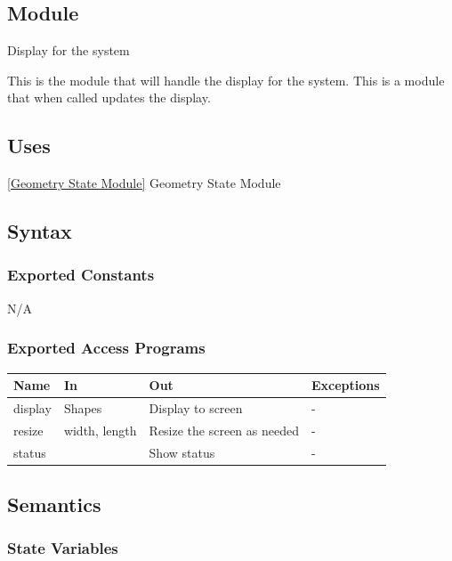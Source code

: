 \documentclass[12pt, titlepage]{article}
\begin{document}

\subsection{Module}

Display for the system

This is the module that will handle the display for the system.
 This is a module that when called updates the display.
\subsection{Uses}
\ref{Geometry State Module} {Geometry State Module}

\subsection{Syntax}

\subsubsection{Exported Constants}

N/A

\subsubsection{Exported Access Programs}

\begin{center}
\begin{tabular}{p{2cm} p{4cm} p{4cm} p{2cm}}
\hline
\textbf{Name} & \textbf{In} & \textbf{Out} & \textbf{Exceptions} \\
\hline
display & Shapes & Display to screen & - \\
resize & width, length & Resize the screen as needed & - \\
status &  & Show status & - \\
\hline
\end{tabular}
\end{center}

\subsection{Semantics}

\subsubsection{State Variables}
\end{document}
